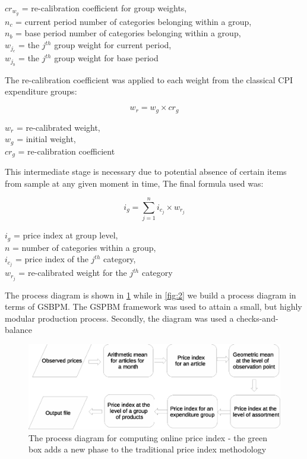 \documentclass[]{article}
\begin{document}
\begin{center}
	$cr_{w_{g}}$ = re-calibration coefficient for group weights, \\
	$n_{c}$ = current period number of categories belonging within a group, \\
	$n_{b}$ = base period number of categories belonging within a group, \\
	$w_{j_{c}}$ = the $j^{th}$ group weight for current period, \\
	$w_{j_{b}}$ = the $j^{th}$ group weight for base period
	
\end{center}

The re-calibration coefficient was applied to each weight from the classical CPI expenditure groups:

\begin{equation}\label{eq:7}
  w_{r} = w_{g} \times cr_{g}
\end{equation}

\begin{center}
	$w_{r}$ = re-calibrated weight, \\
	$w_{g}$ = initial weight, \\
	$cr_{g}$ = re-calibration coefficient
\end{center}

This intermediate stage is necessary due to potential absence of certain items from sample at any given moment in time, 
The final formula used was:

\begin{equation}\label{eq:8}
	i_{g} = \sum_{j=1}^{n} i_{c_{j}} \times w_{r_{j}}
\end{equation}

\begin{center}
	$i_{g}$ = price index at group level, \\
	$n$ = number of categories within a group, \\
	$i_{c_{j}}$ = price index of the $j^{th}$ category, \\
	$w_{r_{j}}$ = re-calibrated weight for the $j^{th}$ category
\end{center}

The process diagram is shown in \ref{fig:1} while in \ref{fig:2} we build a process diagram in terms of GSBPM\cite{gsbpm}. The GSPBM framework was used to attain a small, but highly modular production process. Secondly, the diagram was used a checks-and-balance


\begin{figure}
\centering
\includegraphics[width=0.7\linewidth]{fig1.eps}
\caption{The process diagram for computing online price index - the green box adds a new phase to the traditional price index methodology}
\label{fig:1}
\end{figure}
\end{document}
